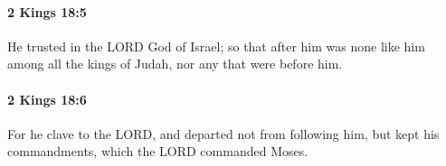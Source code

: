 		\paragraph{2 Kings 18:5} %
			\label{2KINGS-18-5}

			He trusted in the LORD God of Israel; so that after him was none like him among all the kings of Judah, nor any that were before him.


		\paragraph{2 Kings 18:6} %
			\label{2KINGS-18-6}

			For he clave to the LORD, and departed not from following him, but kept his commandments, which the LORD commanded Moses.



